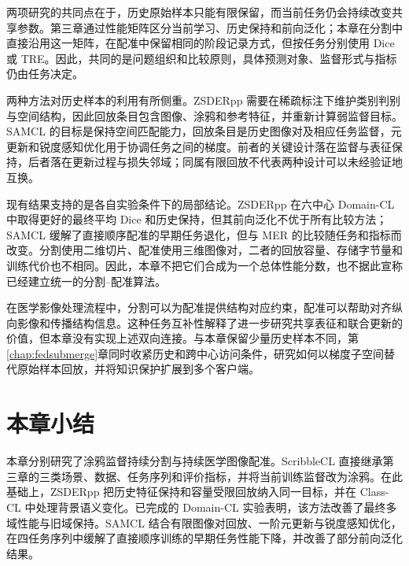 两项研究的共同点在于，历史原始样本只能有限保留，而当前任务仍会持续改变共享参数。第三章通过性能矩阵区分当前学习、历史保持和前向泛化；本章在分割中直接沿用这一矩阵，在配准中保留相同的阶段记录方式，但按任务分别使用 Dice 或 TRE。因此，共同的是问题组织和比较原则，具体预测对象、监督形式与指标仍由任务决定。

两种方法对历史样本的利用有所侧重。ZSDERpp 需要在稀疏标注下维护类别判别与空间结构，因此回放条目包含图像、涂鸦和参考特征，并重新计算弱监督目标。SAMCL 的目标是保持空间匹配能力，回放条目是历史图像对及相应任务监督，元更新和锐度感知优化用于协调任务之间的梯度。前者的关键设计落在监督与表征保持，后者落在更新过程与损失邻域；同属有限回放不代表两种设计可以未经验证地互换。

现有结果支持的是各自实验条件下的局部结论。ZSDERpp 在六中心 Domain-CL 中取得更好的最终平均 Dice 和历史保持，但其前向泛化不优于所有比较方法；SAMCL 缓解了直接顺序配准的早期任务退化，但与 MER 的比较随任务和指标而改变。分割使用二维切片、配准使用三维图像对，二者的回放容量、存储字节量和训练代价也不相同。因此，本章不把它们合成为一个总体性能分数，也不据此宣称已经建立统一的分割--配准算法。

在医学影像处理流程中，分割可以为配准提供结构对应约束，配准可以帮助对齐纵向影像和传播结构信息。这种任务互补性解释了进一步研究共享表征和联合更新的价值，但本章没有实现上述双向连接。与本章保留少量历史样本不同，第\ref{chap:fedsubmerge}章同时收紧历史和跨中心访问条件，研究如何以梯度子空间替代原始样本回放，并将知识保护扩展到多个客户端。

\section{本章小结}
\label{sec:task-cl-summary}

本章分别研究了涂鸦监督持续分割与持续医学图像配准。ScribbleCL 直接继承第三章的三类场景、数据、任务序列和评价指标，并将当前训练监督改为涂鸦。在此基础上，ZSDERpp 把历史特征保持和容量受限回放纳入同一目标，并在 Class-CL 中处理背景语义变化。已完成的 Domain-CL 实验表明，该方法改善了最终多域性能与旧域保持。SAMCL 结合有限图像对回放、一阶元更新与锐度感知优化，在四任务序列中缓解了直接顺序训练的早期任务性能下降，并改善了部分前向泛化结果。
